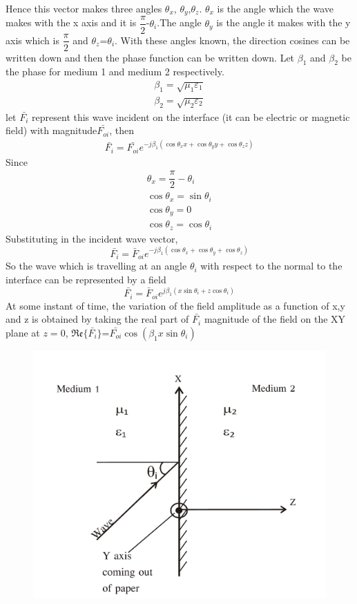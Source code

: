 Hence this vector makes three angles $\theta_x$, $\theta_y$,$\theta_z$. $\theta_x$ is the angle which the wave makes with the x axis and it is $\dfrac{\pi}{2}$-$\theta_i$.The angle $\theta_y$ is the angle it makes with the y axis which is $\dfrac{\pi}{2}$ and $\theta_z$=$\theta_i$. With these angles known, the direction cosines can be written down and then the phase function can be written down. Let $\beta_1$ and $\beta_2$ be the phase for medium 1 and medium 2 respectively.
\begin{align*}
\beta_1=\sqrt{\mu_1\varepsilon_1}\\
\beta_2=\sqrt{\mu_2\varepsilon_2}
\end{align*}
let $\bar{F_i}$ represent this wave incident on the interface (it can be electric or magnetic field) with magnitude$\bar{F_{oi}}$, then
\begin{align*}
\bar{F_{i}}=\bar{F_{oi}}e^{-j\beta_1(\cos\theta_xx +\cos\theta_yy+\cos\theta_zz)}
\end{align*}
Since
\begin{align*}
\theta_x=\dfrac{\pi}{2}-\theta_i\\
\cos\theta _x=\sin \theta_i\\
\cos \theta_y=0\\
\cos\theta_z=\cos \theta_i
\end{align*}
Substituting in the incident wave vector,
$$\bar{F_i}=\bar{F}_{oi}e^{-j\beta_1(\cos \theta_x+\cos \theta_y+\cos \theta_z)}$$
So the wave  which is travelling at an angle $\theta_i$ with respect to the normal to the interface can be represented by a field
$$\bar{F_i}=\bar{F}_{oi}e^{j\beta_1(x\sin \theta_i+z\cos \theta_i)} $$
At some instant of time, the variation of the field amplitude as a function of x,y and z is obtained by taking the real part of $\bar{F_i}$ magnitude of the field on the XY plane at $z=0$, $\mathfrak{Re}\{\bar{F_i}\}$=$\bar{F_{oi}}\cos (\beta_1x\sin \theta_i)$
\begin{figure}[h]
\centering
\includegraphics[width=.7\linewidth]{./graphics/group30b}
\caption{}
\label{fig:group30b}
\end{figure}

